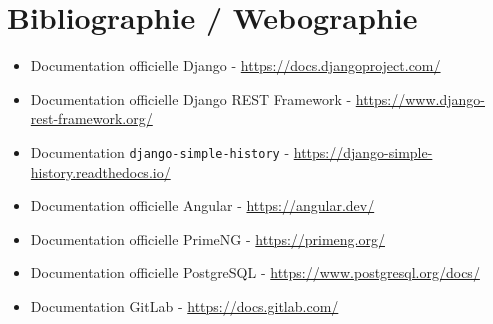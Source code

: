
\chapter*{Bibliographie / Webographie}

\begin{itemize}[leftmargin=1.2cm]
  \item[--] Documentation officielle Django  - 
        \url{https://docs.djangoproject.com/}
  \item[--] Documentation officielle Django REST Framework  - 
        \url{https://www.django-rest-framework.org/}
  \item[--] Documentation \texttt{django-simple-history}  - 
        \url{https://django-simple-history.readthedocs.io/}
  \item[--] Documentation officielle Angular  - 
        \url{https://angular.dev/}
  \item[--] Documentation officielle PrimeNG  - 
        \url{https://primeng.org/}
  \item[--] Documentation officielle PostgreSQL  - 
        \url{https://www.postgresql.org/docs/}
  \item[--] Documentation GitLab  - 
        \url{https://docs.gitlab.com/}
\end{itemize}

\newpage
